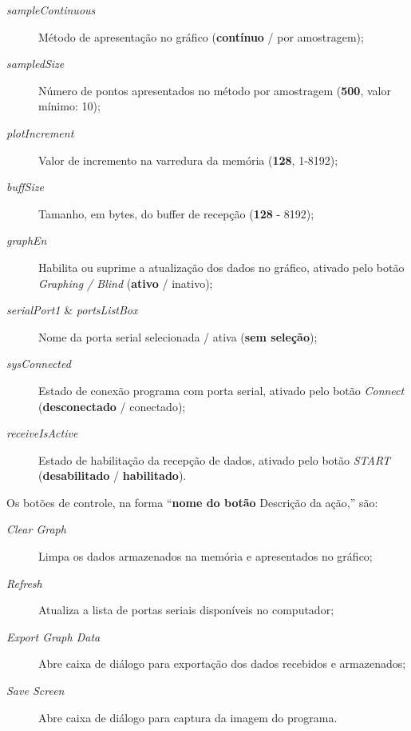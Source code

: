 			\begin{samepage}
				\begin{description}
					\item[\textit{sampleContinuous}] Método de apresentação no gráfico (\textbf{contínuo} / por amostragem);
					\item[\textit{sampledSize}] Número de pontos apresentados no método por amostragem (\textbf{500}, valor mínimo: 10);
					\item[\textit{plotIncrement}] Valor de incremento na varredura da memória (\textbf{128}, 1-8192);
					\item[\textit{buffSize}] Tamanho, em bytes, do buffer de recepção (\textbf{128} -  8192);
					\item[\textit{graphEn}] Habilita ou suprime a atualização dos dados no gráfico, ativado pelo botão \textit{Graphing / Blind} (\textbf{ativo} / inativo);
					\item[\textit{serialPort1} \& \textit{portsListBox}] Nome da porta serial selecionada / ativa (\textbf{sem seleção});
					\item[\textit{sysConnected}] Estado de conexão programa com porta serial, ativado pelo botão \textit{Connect} (\textbf{desconectado} / conectado);
					\item[\textit{receiveIsActive}] Estado de habilitação da recepção de dados, ativado pelo botão \textit{START} (\textbf{desabilitado} / \textbf{habilitado}).
				\end{description}
			\end{samepage}

			Os botões de controle, na forma ``\textbf{nome do botão} Descrição da ação,'' são:

			\begin{description}
				\item[\textit{Clear Graph}] Limpa os dados armazenados na memória e apresentados no gráfico;
				\item[\textit{Refresh}] Atualiza a lista de portas seriais disponíveis no computador;
				\item[\textit{Export Graph Data}] Abre caixa de diálogo para exportação dos dados recebidos e armazenados;
				\item[\textit{Save Screen}] Abre caixa de diálogo para captura da imagem do programa.
			\end{description}


